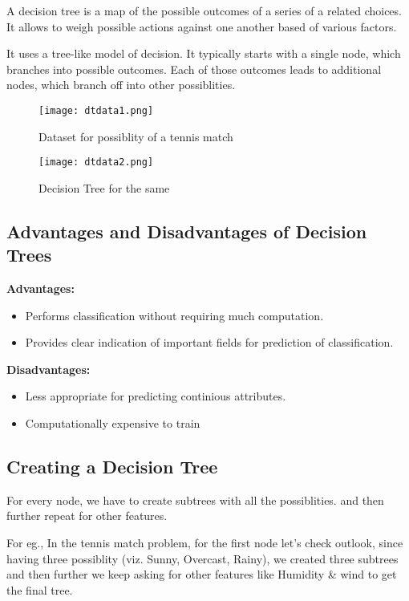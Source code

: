 A decision tree is a map of the possible outcomes of a series of a related choices. It allows to weigh possible actions against one another based of various factors.\par
It uses a tree-like model of decision. It typically starts with a single node, which branches into possible outcomes. Each of those outcomes leads to additional nodes, which branch off into other possiblities. 

\begin{figure}[h]
	\centering
	\texttt{[image: dtdata1.png]}
	\caption{Dataset for possiblity of a tennis match}
	\texttt{[image: dtdata2.png]}
	\caption{Decision Tree for the same}
\end{figure}

\subsection*{Advantages and Disadvantages of Decision Trees}
	\textbf{Advantages:}
	\begin{itemize}
		\item Performs classification without requiring much computation.
		\item Provides clear indication of important fields for prediction of classification.
	\end{itemize}
	\vspace{15mm}
	\textbf{Disadvantages:}
	\begin{itemize}
		\item Less appropriate for predicting continious attributes.
		\item Computationally expensive to train
	\end{itemize}

\vspace{5mm}
\subsection*{Creating a Decision Tree}
	For every node, we have to create subtrees with all the possiblities. and then further repeat for other features.\par
	For eg., In the tennis match problem, for the first node  let's check outlook, since having three possiblity (viz. Sunny, Overcast, Rainy), we created three subtrees and then further we keep asking for other features like Humidity \& wind to get the final tree.  

\vspace{5mm}
